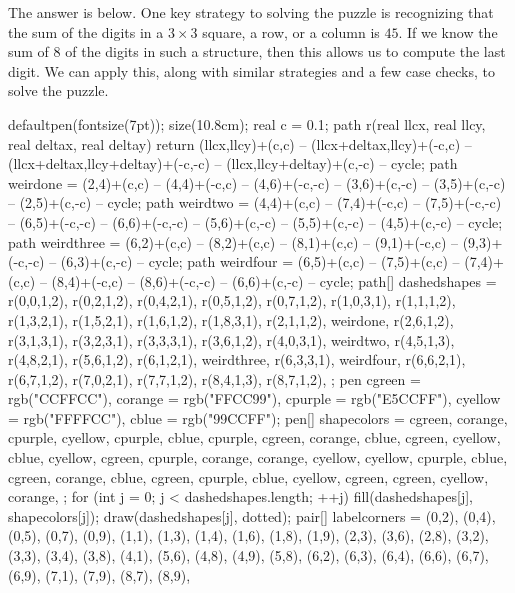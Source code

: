 The answer is below. One key strategy to solving the puzzle is recognizing that the sum of the digits in a $3\times3$ square, a row, or a column is $45$. If we know the sum of $8$ of the digits in such a structure, then this allows us to compute the last digit. We can apply this, along with similar strategies and a few case checks, to solve the puzzle.
	\begin{center}
		\begin{asy}
			defaultpen(fontsize(7pt));
			size(10.8cm);
			real c = 0.1;
			path r(real llcx, real llcy, real deltax, real deltay) {
				return (llcx,llcy)+(c,c) -- (llcx+deltax,llcy)+(-c,c) -- (llcx+deltax,llcy+deltay)+(-c,-c) -- (llcx,llcy+deltay)+(c,-c) -- cycle;
			}
			path weirdone = (2,4)+(c,c) -- (4,4)+(-c,c) -- (4,6)+(-c,-c) -- (3,6)+(c,-c) -- (3,5)+(c,-c) -- (2,5)+(c,-c) -- cycle;
			path weirdtwo = (4,4)+(c,c) -- (7,4)+(-c,c) -- (7,5)+(-c,-c) -- (6,5)+(-c,-c) -- (6,6)+(-c,-c) -- (5,6)+(c,-c) -- (5,5)+(c,-c) -- (4,5)+(c,-c) -- cycle;
			path weirdthree = (6,2)+(c,c) -- (8,2)+(c,c) -- (8,1)+(c,c) -- (9,1)+(-c,c) -- (9,3)+(-c,-c) -- (6,3)+(c,-c) -- cycle;
			path weirdfour = (6,5)+(c,c) -- (7,5)+(c,c) -- (7,4)+(c,c) -- (8,4)+(-c,c) -- (8,6)+(-c,-c) -- (6,6)+(c,-c) -- cycle;
			path[] dashedshapes = {
				r(0,0,1,2), r(0,2,1,2), r(0,4,2,1), r(0,5,1,2), r(0,7,1,2),
				r(1,0,3,1), r(1,1,1,2), r(1,3,2,1), r(1,5,2,1), r(1,6,1,2), r(1,8,3,1),
				r(2,1,1,2), weirdone, r(2,6,1,2),
				r(3,1,3,1), r(3,2,3,1), r(3,3,3,1), r(3,6,1,2),
				r(4,0,3,1), weirdtwo, r(4,5,1,3), r(4,8,2,1),
				r(5,6,1,2),
				r(6,1,2,1), weirdthree, r(6,3,3,1), weirdfour, r(6,6,2,1), r(6,7,1,2),
				r(7,0,2,1), r(7,7,1,2),
				r(8,4,1,3), r(8,7,1,2),
			};
			pen cgreen = rgb("CCFFCC"), corange = rgb("FFCC99"), cpurple = rgb("E5CCFF"), cyellow = rgb("FFFFCC"), cblue = rgb("99CCFF");
			pen[] shapecolors = {
				cgreen, corange, cpurple, cyellow, cpurple,
				cblue, cpurple, cgreen, corange, cblue, cgreen,
				cyellow, cblue, cyellow,
				cgreen, cpurple, corange, corange,
				cyellow, cyellow, cpurple, cblue,
				cgreen,
				corange, cblue, cgreen, cpurple, cblue, cyellow,
				cgreen, cgreen,
				cyellow, corange,
			};
			for (int j = 0; j < dashedshapes.length; ++j) {
				fill(dashedshapes[j], shapecolors[j]);
				draw(dashedshapes[j], dotted);
			}
			pair[] labelcorners = {
				(0,2), (0,4), (0,5), (0,7), (0,9),
				(1,1), (1,3), (1,4), (1,6), (1,8), (1,9),
				(2,3), (3,6), (2,8),
				(3,2), (3,3), (3,4), (3,8),
				(4,1), (5,6), (4,8), (4,9),
				(5,8),
				(6,2), (6,3), (6,4), (6,6), (6,7), (6,9),
				(7,1), (7,9),
				(8,7), (8,9),
}
\end{asy}
\end{center}
